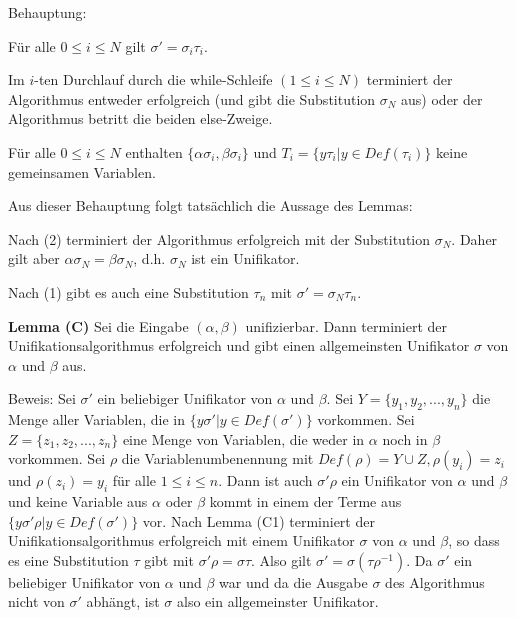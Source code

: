 \documentclass[a4paper]{article}
\renewcommand{\note}[2]{\begin{noteBox} \textbf{#1} #2 \end{noteBox}}
\begin{document}
\begin{multicols}{3}
  Behauptung:
  \begin{enumerate*}
    \item Für alle $0\leq i\leq N$ gilt $\sigma'=\sigma_i\tau_i$.
    \item Im $i$-ten Durchlauf durch die while-Schleife $(1\leq i\leq N)$ terminiert der Algorithmus entweder erfolgreich (und gibt die Substitution $\sigma_N$ aus) oder der Algorithmus betritt die beiden else-Zweige.
    \item Für alle $0\leq i\leq N$ enthalten $\{\alpha\sigma_i,\beta\sigma_i\}$ und $T_i=\{y\tau_i|y\in Def(\tau_i)\}$ keine gemeinsamen Variablen.
  \end{enumerate*}

  Aus dieser Behauptung folgt tatsächlich die Aussage des Lemmas:
  \begin{itemize*}
    \item Nach (2) terminiert der Algorithmus erfolgreich mit der Substitution $\sigma_N$. Daher gilt aber $\alpha\sigma_N=\beta\sigma_N$, d.h. $\sigma_N$ ist ein Unifikator.
    \item Nach (1) gibt es auch eine Substitution $\tau_n$ mit $\sigma'=\sigma_N\tau_n$.
  \end{itemize*}

  \note{Lemma (C)}{Sei die Eingabe $(\alpha,\beta)$ unifizierbar. Dann terminiert der Unifikationsalgorithmus erfolgreich und gibt einen allgemeinsten Unifikator $\sigma$ von $\alpha$ und $\beta$ aus.}

  Beweis: Sei $\sigma'$ ein beliebiger Unifikator von $\alpha$ und $\beta$. Sei $Y=\{y_1,y_2,... ,y_n\}$ die Menge aller Variablen, die in $\{y\sigma'|y\in Def(\sigma')\}$ vorkommen.
  Sei $Z=\{z_1,z_2,...,z_n\}$ eine Menge von Variablen, die weder in $\alpha$ noch in $\beta$ vorkommen.
  Sei $\rho$ die Variablenumbenennung mit $Def(\rho)=Y\cup Z,\rho(y_i) =z_i$ und $\rho(z_i)=y_i$ für alle $1\leq i\leq n$.
  Dann ist auch $\sigma'\rho$ ein Unifikator von $\alpha$ und $\beta$ und keine Variable aus $\alpha$ oder $\beta$ kommt in einem der Terme aus $\{y\sigma'\rho|y\in Def(\sigma')\}$ vor.
  Nach Lemma (C1) terminiert der Unifikationsalgorithmus erfolgreich mit einem Unifikator $\sigma$ von $\alpha$ und $\beta$, so dass es eine Substitution $\tau$ gibt mit $\sigma'\rho=\sigma\tau$.
  Also gilt $\sigma'=\sigma(\tau\rho^{-1})$.
  Da $\sigma'$ ein beliebiger Unifikator von $\alpha$ und $\beta$ war und da die Ausgabe $\sigma$ des Algorithmus nicht von $\sigma'$ abhängt, ist $\sigma$ also ein allgemeinster Unifikator.


\end{multicols}
\end{document}
